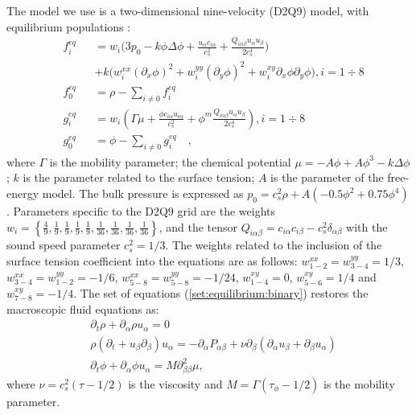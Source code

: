 \documentclass[preprint,12pt]{elsarticle}
\begin{document}
The model we use is a two-dimensional nine-velocity (D2Q9) model,
with equilibrium populations \cite{pooley-contact}:
\begin{equation}
\label{set:equilibrium:binary}
\begin{aligned}
&f_i^{eq}&&=w_i 
\biggl(3
p_0 - k \phi \Delta \phi
+\frac{u_{\alpha}c_{i\alpha}}{c_s^2}+\frac{Q_{i\alpha\beta}u_{\alpha } u_ {
\beta}}{2 c_s^4}\biggr)\\
&&&+k\bigl(w_i^{xx} (\partial_x \phi)^2+w_i^{yy} (\partial_y \phi)^2 +w_i^{xy} \partial_x
\phi \partial_y \phi \bigr), i=1\div8\\
&f_0^{eq}&&=\rho-\sum_{i\neq0}{f_i^{eq}}\\
&g_i^{eq}&&=w_i\left(\Gamma \mu + \frac{\phi c_{i\alpha} u_{i\alpha}}{c_s^2}+\phi^m
\frac{Q_{i\alpha\beta}u_{\alpha}u_{\beta}}{2 c_s^4}\right), i=1\div8 \\
&g_0^{eq}&&=\phi-\sum_{i\neq0}{g_i^{eq}}\quad,
\end{aligned}
\end{equation}
where $\Gamma$ is the mobility parameter; the chemical potential
$\mu=-A\phi+A\phi^3-k\Delta\phi$; $k$ is the parameter related to the surface
tension; $A$ is the parameter of the free-energy model.  The bulk pressure
is expressed as $p_0=c_s^2 \rho +A (-0.5 \phi^2+0.75 \phi^4)$. 
Parameters specific to the D2Q9 grid are the weights
$w_i=\left\{\frac{4}{9},\frac{1}{9},\frac{1}{9},\frac{1}{9},\frac{1}{9},
\frac{1}{36},\frac{1}{36},\frac{1}{36},\frac{1}{36}\right\}$, and the tensor
$Q_{i\alpha\beta}=c_{i\alpha} c_{i\beta} - c_s^2 \delta_{\alpha\beta}$ with
the sound speed parameter $c_s^2=1/3$.  The weights related to the
inclusion of the surface tension coefficient into the equations are as follows:
$w^{xx}_{1-2}=w^{yy}_{3-4}=1/3$, $w^{xx}_{3-4}=w^{yy}_{1-2}=-1/6$,
$w^{xx}_{5-8}=w^{yy}_{5-8}=-1/24$, $w^{xy}_{1-4}=0$, $w^{xy}_{5-6}=1/4$ and
$w^{xy}_{7-8}=-1/4$. The set of equations (\ref{set:equilibrium:binary}) restores the
macroscopic
fluid equations as:
\begin{equation}
\begin{aligned}
&\partial_t \rho+ \partial_{\alpha} \rho u_{\alpha}=0\\
&\rho\left(\partial_t+u_{\beta}\partial_{\beta}\right) u_{\alpha}=
-\partial_{\alpha}P_{\alpha \beta} +
\nu\partial_{\beta}\left(\partial_{\alpha}u_{\beta}+\partial_{\beta} u_{\alpha}\right)\\
&\partial_t \phi + \partial_{\alpha} \phi u_{\alpha}=M \partial^2_{\beta\beta} \mu,
\end{aligned}
\label{binary:fluid:system}
\end{equation}
where $\nu=c_s^2 (\tau-1/2)$ is the viscosity and
$M=\Gamma(\tau_{\phi}-1/2)$ is the mobility parameter. 
\end{document}
